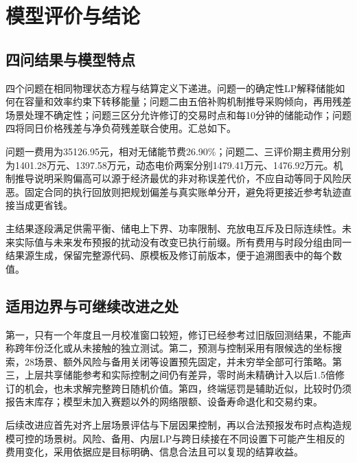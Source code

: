 \section{模型评价与结论}

\subsection{四问结果与模型特点}

四个问题在相同物理状态方程与结算定义下递进。问题一的确定性LP解释储能如何在容量和效率约束下转移能量；问题二由五倍补购机制推导采购倾向，再用残差场景处理不确定性；问题三区分允许修订的交易时点和每10分钟的储能动作；问题四将同日价格残差与净负荷残差联合使用。汇总如下。



问题一费用为35126.95元，相对无储能节费26.90\%；问题二、三评价期主费用分别为1401.28万元、1397.58万元，动态电价两案分别1479.41万元、1476.92万元。机制推导说明采购偏高可以源于经济最优的非对称误差代价，不应自动等同于风险厌恶。固定合同的执行回放则把规划偏差与真实账单分开，避免将更接近参考轨迹直接当成更省钱。

主结果逐段满足供需平衡、储电上下界、功率限制、充放电互斥及日际连续性。未来实际值与未来发布预报的扰动没有改变已执行前缀。所有费用与时段分组由同一结果源生成，保留完整源代码、原模板及修订前版本，便于追溯图表中的每个数值。

\subsection{适用边界与可继续改进之处}

第一，只有一个年度且一月校准窗口较短，修订已经参考过旧版回测结果，不能声称跨年份泛化或从未接触的独立测试。第二，预测与控制采用有限候选的坐标搜索，28场景、额外风险与备用关闭等设置预先固定，并未穷举全部可行策略。第三，上层共享储能参考和实际控制之间仍有差异，零时尚未精确计入以后1.5倍修订的机会，也未求解完整跨日随机价值。第四，终端惩罚是辅助近似，比较时仍须报告末库存；模型未加入赛题以外的网络限额、设备寿命退化和交易约束。

后续改进应首先对齐上层场景评估与下层因果控制，再以合法预报发布时点构造规模可控的场景树。风险、备用、内层LP与跨日续接在不同设置下可能产生相反的费用变化，采用依据应是目标明确、信息合法且可以复现的结算收益。
